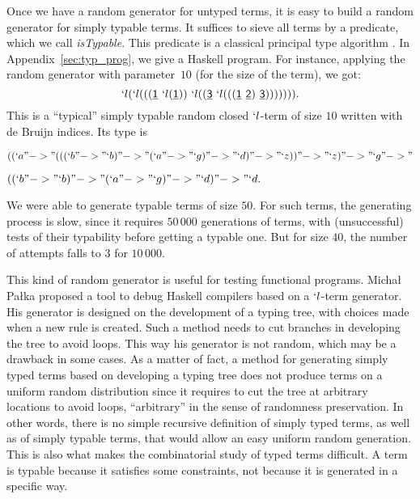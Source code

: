 \documentclass{jfp1}
\newcommand{\Var}[1]{\underline{\mathsf{#1}}}
\begin{document}
Once we have a random generator for untyped terms, it is easy to build a random generator
for simply typable terms. It suffices to sieve all terms by a predicate, which we call
\emph{isTypable}. This predicate is a classical principal type
algorithm
\cite{newman43:_strat,DBLP:conf/popl/DamasM82,DBLP:journals/logcom/Hindley08}.  In
Appendix~\ref{sec:typ_prog}, we give a \textsf{Haskell} program.
For instance,
applying the random generator with parameter~$10$ (for the size of the term), we got:
\begin{displaymath}
  `l (`l (((\Var{1}\  `l (\Var{1}))\  `l ((\Var{3}\  `l (((\Var{1}\  \Var{2})\  \Var{3}))))))) .
\end{displaymath}
This is a ``typical'' simply typable random closed $`l$-term of size $10$ written with de
Bruijn indices.  Its type is

\begin{center}
  \begin{math}
    ((`a "->" (((`b "->" `b) "->" (`a "->" `g) "->" `d) "->" `z)) "->" `z) "->" `g "->"
   \end{math}

    \begin{math}
    ((`b "->" `b) "->" (`a "->" `g) "->" `d) "->" `d .
  \end{math}
\end{center}

We were able to generate typable terms of size $50$.
For such terms, the generating process is slow, since it requires $50\,000$ generations of
terms, with (unsuccessful) tests of their typability before getting a typable one.  But for
size $40$, 
the number of attempts falls to $3$ for $10\,000$.


This kind of random generator is useful for testing functional programs. Micha{\l}
Pa{\l}ka \cite{palka12:_testin_compil,Palka:2011:TOC:1982595.1982615} proposed a tool
to debug Haskell compilers based on a $`l$-term generator.  His generator is
designed on the development of a typing tree, with choices made when a new rule is
created.  Such a method needs to cut branches in developing the tree to avoid loops.
This way his generator is not random, which may be a drawback in some cases.  As a
matter of fact, a method for generating simply typed terms based on developing a
typing tree does not produce terms on a uniform random distribution since it requires
to cut the tree at arbitrary locations to avoid loops, ``arbitrary'' in the sense of
randomness preservation.  In other words, there is no simple recursive definition of
simply typed terms, as well as of simply typable terms,  that would allow an easy uniform random generation.  This is also
what makes the combinatorial study of typed terms difficult.  A term is typable
because it satisfies some constraints, not because it is generated in a specific way.
\end{document}
